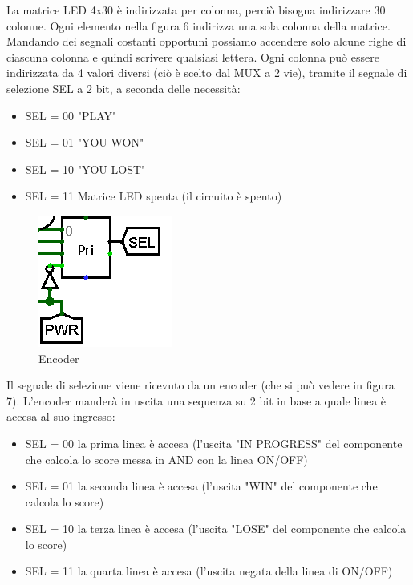 \documentclass[11pt]{article}
\begin{document}
La matrice LED 4x30 è indirizzata per colonna, perciò bisogna indirizzare 30 colonne.
Ogni elemento nella figura 6 indirizza una sola colonna della matrice. Mandando dei segnali
costanti opportuni possiamo accendere solo alcune righe di ciascuna colonna e quindi scrivere
qualsiasi lettera. Ogni colonna può essere indirizzata da 4 valori diversi (ciò è scelto dal MUX a 2 vie), 
tramite il segnale di selezione SEL a 2 bit, a seconda delle necessità:
\begin{itemize}
\item SEL = 00  "PLAY" 
\item SEL = 01  "YOU WON"
\item SEL = 10  "YOU LOST"
\item SEL = 11  Matrice LED spenta (il circuito è spento)
\end{itemize}

\begin{figure}
\includegraphics[width=0.9\linewidth]{immagini/encoder} 
\caption{Encoder}
\label{fig:fig7}
\end{figure}

Il segnale di selezione viene ricevuto da un encoder (che si può vedere in figura 7).
L'encoder manderà in uscita una sequenza su 2 bit in base a quale linea è accesa al suo ingresso:

\begin{itemize}
\item SEL = 00  la prima linea è accesa (l'uscita "IN PROGRESS" del componente che calcola lo score messa in AND con la linea ON/OFF)
\item SEL = 01  la seconda linea è accesa (l'uscita "WIN" del componente che calcola lo score)
\item SEL = 10  la terza linea è accesa (l'uscita "LOSE" del componente che calcola lo score)
\item SEL = 11  la quarta linea è accesa (l'uscita negata della linea di ON/OFF)
\end{itemize}
\end{document}
